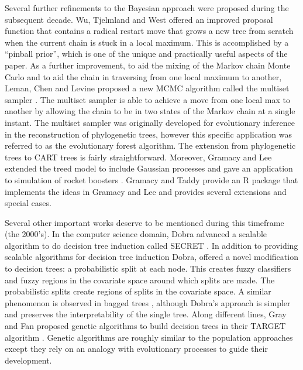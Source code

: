Several further refinements to the Bayesian approach were proposed during the subsequent decade. Wu, Tjelmland and West \cite{wu2007bayesian} offered an improved proposal function that contains a radical restart move that grows a new tree from scratch when the current chain is stuck in a local maximum. This is accomplished by a ``pinball prior'', which is one of the unique and practically useful aspects of the paper. As a further improvement, to aid the mixing of the Markov chain Monte Carlo and to aid the chain in traversing from one local maximum to another, Leman, Chen and Levine proposed a new MCMC algorithm called the multiset sampler \cite{leman2009multiset}. The multiset sampler is able to achieve a move from one local max to another by allowing the chain to be in two states of the Markov chain at a single instant. The multiset sampler was originally developed for evolutionary inference in the reconstruction of phylogenetic trees, however this specific application was referred to as the evolutionary forest algorithm. The extension from phylogenetic trees to CART trees is fairly straightforward.  Moreover, Gramacy and Lee extended the treed model to include Gaussian processes and gave an application to simulation of rocket boosters \cite{gramacy2008bayesian}. Gramacy and Taddy \cite{gramacy2012categorical} provide an R package that implements the ideas in Gramacy and Lee \cite{gramacy2008bayesian} and provides several extensions and special cases. 

Several other important works deserve to be mentioned during this timeframe (the 2000's).  In the computer science domain, Dobra advanced a scalable algorithm to do decision tree induction called SECRET \cite{dobra2002secret}. In addition to providing scalable algorithms for decision tree induction Dobra, offered a novel modification to decision trees: a probabilistic split at each node. This creates fuzzy classifiers and fuzzy regions in the covariate space around which splits are made. The probabilistic splits create regions of splits in the covariate space. A similar phenomenon is observed in bagged trees \cite{breiman1996bagging}, although Dobra's approach is simpler and preserves the interpretability of the single tree. Along different lines, Gray and Fan proposed genetic algorithms to build decision trees in their TARGET algorithm \cite{gray2008classification}. Genetic algorithms are roughly similar to the population approaches \cite{cappe2004population} except they rely on an analogy with evolutionary processes to guide their development.  

